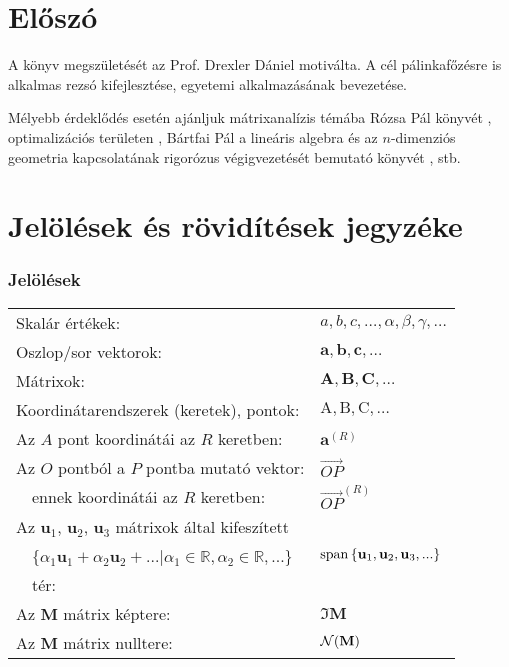 \chapter*{Előszó}

A könyv megszületését az Prof. Drexler Dániel motiválta. A cél pálinkafőzésre is alkalmas rezsó kifejlesztése, egyetemi alkalmazásának bevezetése.


Mélyebb érdeklődés esetén ajánljuk mátrixanalízis témába Rózsa Pál könyvét \cite{RozsaPalMatrix}, optimalizációs területen \cite{polyak1987introduction}, Bártfai Pál a lineáris algebra és az $n$-dimenziós geometria kapcsolatának rigorózus végigvezetését bemutató könyvét \cite{BartfaiNDimLinGeom}, stb.


\chapter*{Jelölések és rövidítések jegyzéke}


\subsection*{Jelölések}


\begin{tabular}{ll}
	Skalár értékek: & $a,b,c,\dots,\alpha,\beta,\gamma,\dots$ \\
	Oszlop/sor vektorok: & $\mathbf a,\mathbf b,\mathbf c,\dots$ \\
	Mátrixok: &$\mathbf A,\mathbf B, \mathbf C,\dots$\\
	Koordinátarendszerek (keretek), pontok: &$\mathrm A,\mathrm B, \mathrm C,\dots$\\
	Az $A$ pont koordinátái az $R$ keretben: &$\mathbf a^{(R)}$\\
	Az $O$ pontból a $P$ pontba mutató vektor: &$\overrightarrow{OP}$\\
	 \ \ ennek koordinátái az $R$ keretben: &$\overrightarrow{OP}^{(R)}$\\
	 Az $\mathbf u_1$, $\mathbf u_2$, $\mathbf u_3$ mátrixok által kifeszített & \\
	 \ \ $\{ \alpha_1\mathbf u_1+\alpha_2\mathbf u_2+... | \alpha_1\in\mathbb R, \alpha_2\in\mathbb R, ... \}$ & $\operatorname{span} \left\{ \mathbf u_1,\mathbf u_2,\mathbf u_3,... \right\}$ \\
	 \ \ tér: & \\
	 Az $\mathbf M$ mátrix képtere: &$\Im{\mathbf M}$\\
	 Az $\mathbf M$ mátrix nulltere: &$\mathcal N({\mathbf M})$
\end{tabular}

